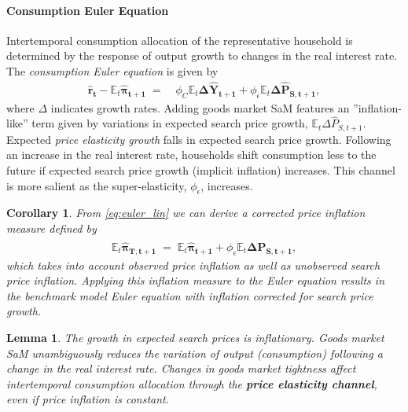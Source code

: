\documentclass[12pt,3p,authoryear,review]{elsarticle}
\newtheorem{corollary}{Corollary}
\newtheorem{lemma}{Lemma}
\begin{document}
\paragraph{Consumption Euler Equation}%
Intertemporal consumption allocation of the representative household is determined by the response of output growth to changes in the real interest rate. The \emph{consumption Euler equation} is given by%
\begin{align}\label{eq:euler_lin}%
	\boldsymbol{\hat{r}_t} - \mathbb{E}_t \boldsymbol{\hat{\pi}_{t+1}} \; = & \; \phi_C \mathbb{E}_t \boldsymbol{\Delta \hat{Y}_{t+1}} + \phi_\epsilon \mathbb{E}_t \boldsymbol{\Delta \hat{P}_{S,t+1}},%
\end{align}%
where $\Delta$ indicates growth rates. Adding goods market SaM features an ''inflation-like'' term given by variations in expected search price growth, $\mathbb{E}_t \Delta \hat{P}_{S,t+1}$. Expected \emph{price elasticity growth} falls in expected search price growth. Following an increase in the real interest rate, households shift consumption less to the future if expected search price growth (implicit inflation) increases. This channel is more salient as the super-elasticity, $\phi_\epsilon$, increases.%
\begin{corollary}\label{corr:corrected_inflation}%
	From \eqref{eq:euler_lin} we can derive a \emph{corrected price inflation measure} defined by%
	\begin{align}%
		\mathbb{E}_t \boldsymbol{\hat{\pi}_{T,t+1}} \; = \; \mathbb{E}_t \boldsymbol{\hat{\pi}_{t+1}} + \phi_\epsilon \mathbb{E}_t \boldsymbol{\Delta\hat{P}_{S,t+1}},%
	\end{align}%
	which takes into account observed price inflation as well as unobserved search price inflation. Applying this inflation measure to the Euler equation results in the benchmark model Euler equation with inflation corrected for search price growth.%
\end{corollary}%
\begin{lemma}\label{lem:euler}%
	The growth in expected search prices is inflationary. Goods market SaM unambiguously reduces the variation of output (consumption) following a change in the real interest rate. Changes in goods market tightness affect intertemporal consumption allocation through the \textbf{price elasticity channel}, even if price inflation is constant.%
\end{lemma}%
\end{document}
